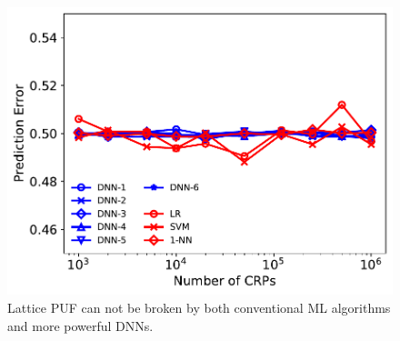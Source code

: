 \begin{figure}[t!]
\centering
\includegraphics[width = 0.7\linewidth]{./figs/ml_attack_lattice_puf_new.pdf}
\caption{Lattice PUF can not be broken by both conventional ML algorithms and more powerful DNNs.}
\label{fig:ml_attack_3}
\end{figure}


